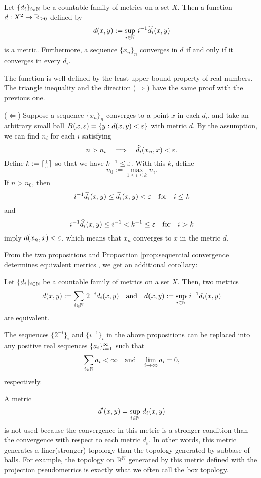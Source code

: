 \begin{prop}
Let $\{d_i\}_{i\in\mathbb{N}}$ be a countable family of metrics on a set $X$.
Then a function $d:X^2\to\R_{\ge0}$ defined by
\[d(x,y):=\sup_{i\in\mathbb{N}}\,i^{-1}\widehat d_i(x,y)\]
is a metric.
Furthermore, a sequence $\{x_n\}_n$ converges in $d$ if and only if it converges in every $d_i$.
\end{prop}
\begin{pf}
The function is well-defined by the least upper bound property of real numbers.
The triangle inequality and the direction ($\Rightarrow$) have the same proof with the previous one.

($\Leftarrow$)
Suppose a sequence $\{x_n\}_n$ converges to a point $x$ in each $d_i$, and take an arbitrary small ball $B(x,\varepsilon)=\{y:d(x,y)<\varepsilon\}$ with metric $d$.
By the assumption, we can find $n_i$ for each $i$ satisfying
\[n>n_i\impl\hat d_i(x_n,x)<\e.\]
Define $k:=\lceil\frac1{\varepsilon}\rceil$ so that we have $k^{-1}\le\varepsilon$.
With this $k$, define
\[n_0:=\max_{1\le i\le k}n_i.\]
If $n>n_0$, then
\[i^{-1}\widehat d_i(x,y)\le\widehat d_i(x,y)<\varepsilon\quad\text{for}\quad i\le k\]
and
\[i^{-1}\widehat d_i(x,y)\le i^{-1}<k^{-1}\le\varepsilon\quad\text{for}\quad i>k\]
imply $d(x_n,x)<\varepsilon$, which means that $x_n$ converges to $x$ in the metric $d$.
\end{pf}

From the two propositions and Proposition \ref{prop:sequential convergence determines equivalent metrics}, we get an additional corollary:
\begin{cor}
Let $\{d_i\}_{i\in\mathbb{N}}$ be a countable family of metrics on a set $X$.
Then, two metrics
\[d(x,y):=\sum_{i\in\mathbb{N}}\,2^{-i}d_i(x,y)\quad\text{and}\quad d(x,y):=\sup_{i\in\mathbb{N}}\,i^{-1}d_i(x,y)\]
are equivalent.
\end{cor}

The sequences $\{2^{-i}\}_i$ and $\{i^{-1}\}_i$ in the above propositions can be replaced into any positive real sequences $\{a_i\}_{i=1}^\infty$ such that
\[\sum_{i\in\N}a_i<\oo\quad\text{and}\quad\lim_{i\to\oo}a_i=0,\]
respectively.
\begin{rmk}
A metric
\[d'(x,y)=\sup_{i\in\mathbb{N}}\,d_i(x,y)\]
is not used because the convergence in this metric is a stronger condition than the convergence with respect to each metric $d_i$.
In other words, this metric generates a finer(stronger) topology than the topology generated by subbase of balls.
For example, the topology on $\mathbb{R}^{\mathbb{N}}$ generated by this metric defined with the projection pseudometrics is exactly what we often call the box topology.
\end{rmk}

